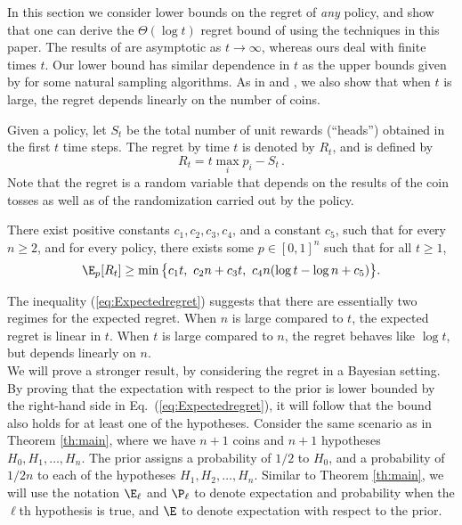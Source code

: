 In this section we consider lower bounds on the regret of {\em any} policy, and show that one can derive
the $\Theta(\log t)$ regret bound of
\cite{LR85} using the techniques in this paper.
The results of \cite{LR85} are asymptotic as $t\to \infty$, whereas ours deal with
finite times $t$.
Our lower bound has similar dependence in $t$ as the upper bounds given by \cite{AuerCesaBianchiFischer02}
for some natural sampling algorithms.
As in \cite{LR85} and \cite{AuerCesaBianchiFischer02}, we also show that when $t$ is large, the regret depends
linearly on the number of coins.

Given a policy, let $S_t$ be the total number of unit rewards (``heads'')  obtained in the first $t$ time steps.
The regret by time $t$ is denoted by $R_t$, and is defined by
$$
R_t = t \max_i p_i - S_t \,.
$$
Note that the regret is a random variable that depends on the results of
the coin tosses as well as of the randomization carried out by the policy.

\begin{theorem}
\label{th:regbndspecial}
There exist positive constants $c_1,c_2,c_3,c_4$, and a constant $c_5$,
such that for every
$n\geq 2$, and for every policy, there exists some $p\in[0,1]^n$ such that for all
$t\ge 1$,
\begin{equation}
\label{eq:Expectedregret}
\E_p [R_t] \geq \min \big\{c_1 t,\  c_2 n  +c_3t , \ c_4 n  (\log t - \log n + c_5   )\big\}.
\end{equation}
\end{theorem}

The inequality (\ref{eq:Expectedregret}) suggests that there are essentially two regimes
for the expected regret. When $n$ is large compared to $t$, the
expected regret is linear in $t$. When $t$ is large compared to $n$,
the regret behaves like $\log t$, but
depends linearly on $n$.
\\
\proof
We will prove a stronger result, by considering the regret in a Bayesian setting.
By proving that the expectation with respect to the prior is lower bounded by the right-hand side
in Eq.~(\ref{eq:Expectedregret}), it will follow that the bound also holds for at least one of
the hypotheses.
Consider the same scenario as in Theorem \ref{th:main}, where we have $n+1$ coins
and $n+1$ hypotheses $H_0, H_1,\ldots, H_n$.
The prior assigns a probability of $1/2$ to $H_0$, and a probability of $1/2n$ to each of
the hypotheses $H_1,H_2,\ldots,H_n$.
Similar to Theorem \ref{th:main}, we will use the notation $\E_\ell$ and $\P_\ell$ to denote
expectation and probability when the $\ell$th hypothesis is true, and $\E$ to denote expectation with respect to the prior.

